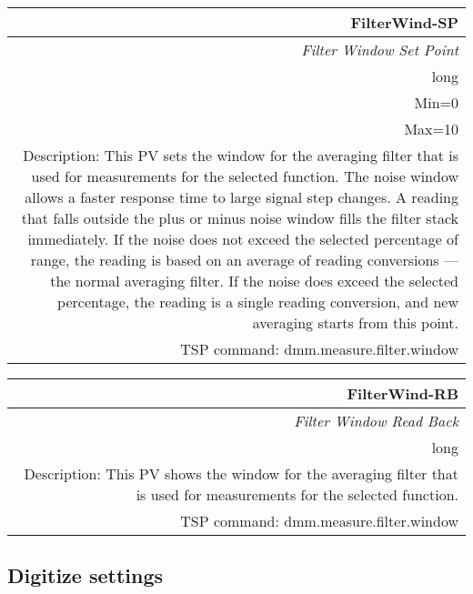 \documentclass[openany]{article}
\begin{document}
		\begin{tabular}{N}
			\hline
			\bfseries FilterWind-SP\label{pv:filterwind-sp} \\ \hline
			\emph{Filter Window Set Point} \\
			long \\
			Min=0 \\
			Max=10 \\
			Description: This PV sets the window for the averaging filter that is used for measurements for the selected function. The noise window allows a faster response time to large signal step changes. A reading that falls outside the plus or minus noise window fills the filter stack immediately. If the noise does not exceed the selected percentage of range, the reading is based on an average of reading conversions — the normal averaging filter. If the noise does exceed the selected percentage, the reading is a single reading conversion, and new averaging starts from this point. \\
			TSP command: dmm.measure.filter.window
		\end{tabular}

		\begin{tabular}{N}
			\hline
			\bfseries FilterWind-RB\label{pv:filterwind-rb} \\ \hline
			\emph{Filter Window Read Back} \\
			long \\
			Description: This PV shows the window for the averaging filter that is used for measurements for the selected function. \\
			TSP command: dmm.measure.filter.window
		\end{tabular}
	
	\subsection{Digitize settings}\label{pvgroup:digitize-settings}

		\paragraph{} %
\end{document}
